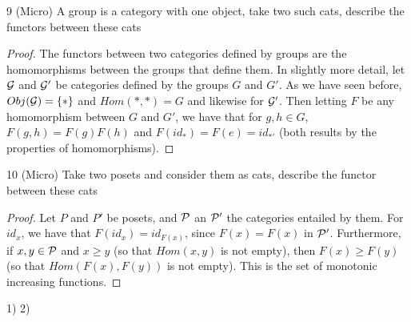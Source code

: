 \begin{exercise}{9 (Micro)}
A group is a category with one object, take two such cats, describe the functors between these cats
\end{exercise}
\begin{proof}
The functors between two categories defined by groups are the homomorphisms between the groups that define them.
In slightly more detail, let $\mathcal{G}$ and $\mathcal{G}'$ be categories defined by the groups $G$ and $G'$.
As we have seen before, $Obj(\mathcal{G}) = \{\ast\}$ and $Hom(\ast, \ast) = G$ and likewise for $\mathcal{G}'$.
Then letting $F$ be any homomorphism between $G$ and $G'$, we have that for $g, h \in G$, $F(g, h) = F(g) F(h)$ and $F(id_\ast) = F(e) = id_{\ast'}$ (both results by the properties of homomorphisms).
\end{proof} 

\begin{exercise}{10 (Micro)}
Take two posets and consider them as cats, describe the functor between these cats
\end{exercise}
\begin{proof}
Let $P$ and $P'$ be posets, and $\mathcal{P}$ an $\mathcal{P}'$ the categories entailed by them.
For $id_x$, we have that $F(id_x) = id_{F(x)}$, since $F(x) = F(x)$ in $\mathcal{P}'$.
Furthermore, if $x, y \in \mathcal{P}$ and $x \geq y$ (so that $Hom(x, y)$ is not empty), then $F(x) \geq F(y)$ (so that $Hom(F(x), F(y))$ is not empty).
This is the set of monotonic increasing functions.
\end{proof} 

1) 
2) 

